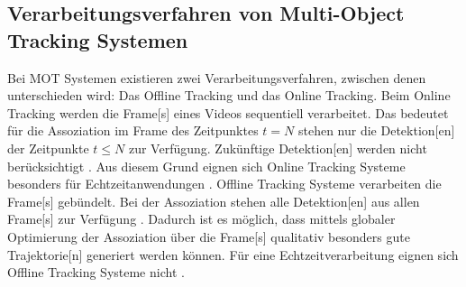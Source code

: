\subsection{Verarbeitungsverfahren von Multi-Object Tracking Systemen} \label{sec:MOT Verarbeitungsverfahren}
Bei \gls{MOT} Systemen existieren zwei Verarbeitungsverfahren, zwischen denen unterschieden wird: Das \gls{Offline Tracking} und das \gls{Online Tracking}. Beim \gls{Online Tracking} werden die \gls{Frame}[s] eines Videos sequentiell verarbeitet. Das bedeutet für die \gls{Assoziation} im \gls{Frame} des Zeitpunktes \(t=N\) stehen nur die \gls{Detektion}[en] der Zeitpunkte \(t \leq N\)  zur Verfügung. Zukünftige \gls{Detektion}[en] werden nicht berücksichtigt \cite{Luo.2022}. Aus diesem Grund eignen sich \gls{Online Tracking} Systeme besonders für Echtzeitanwendungen \cite{Bewley.2016}. \gls{Offline Tracking} Systeme verarbeiten die \gls{Frame}[s] gebündelt. Bei der \gls{Assoziation} stehen alle \gls{Detektion}[en] aus allen \gls{Frame}[s] zur Verfügung \cite{Luo.2022}. Dadurch ist es möglich, dass mittels globaler Optimierung der \gls{Assoziation} über die \gls{Frame}[s] qualitativ besonders gute \gls{Trajektorie}[n] generiert werden können. Für eine Echtzeitverarbeitung eignen sich \gls{Offline Tracking} Systeme nicht \cite{Luo.2022}. \par